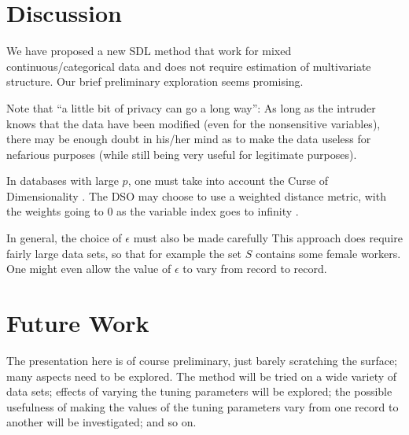 \documentclass[11pt]{article}
\begin{document}
\section{Discussion}

We have proposed a new SDL method that work for mixed
continuous/categorical data and does not require estimation of
multivariate structure.  Our brief preliminary exploration seems
promising.

Note that ``a little bit of privacy can go a long way'':  As long as the
intruder knows that the data have been modified (even for the
nonsensitive variables), there may be enough doubt in his/her mind as to
make the data useless for nefarious purposes (while still being very
useful for legitimate purposes).

In databases with large $p$, one must take into account the Curse of
Dimensionality \cite{beyer}.  The DSO may choose to use a weighted
distance metric, with the weights going to 0 as the variable index goes
to infinity \cite{matloff2015}.

In general, the choice of $\epsilon$ must also be made carefully
This approach does require fairly large data sets, so that for example
the set $S$ contains some female workers.  One might even allow the
value of $\epsilon$ to vary from record to record.

\section{Future Work}

The presentation here is of course preliminary, just barely scratching
the surface; many aspects need to be explored.  The method will be tried
on a wide variety of data sets; effects of varying the tuning parameters
will be explored; the possible usefulness of making the values of the
tuning parameters vary from one record to another will be investigated;
and so on.
\end{document}
